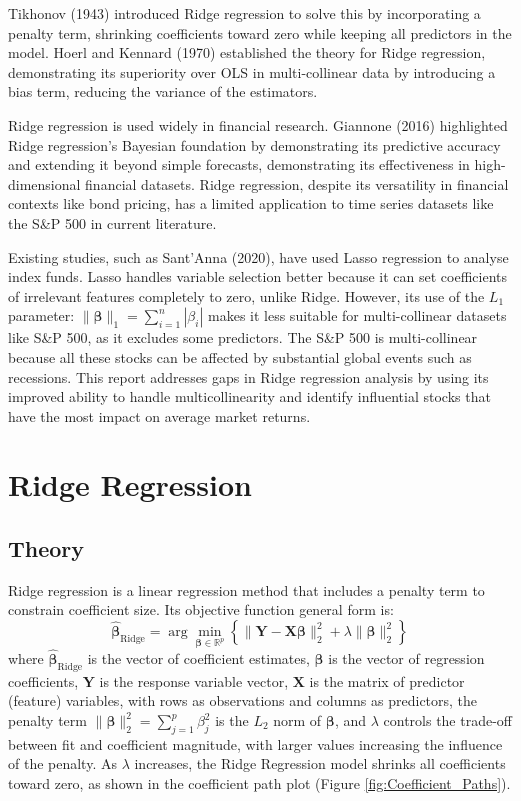 \documentclass[12pt]{report} %
\begin{document}
Tikhonov (1943) introduced Ridge regression to solve this by incorporating a penalty term, shrinking coefficients toward zero while keeping all predictors in the model.\cite{hailiang2023} Hoerl and Kennard (1970) established the theory for Ridge regression, demonstrating its superiority over OLS in multi-collinear data by introducing a bias term, reducing the variance of the estimators.\cite{hoerlken1970} 

Ridge regression is used widely in financial research. Giannone (2016) highlighted Ridge regression's Bayesian foundation by demonstrating its predictive accuracy and extending it beyond simple forecasts, demonstrating its effectiveness in high-dimensional financial datasets.\cite{giannone2016} Ridge regression, despite its versatility in financial contexts like bond pricing, has a limited application to time series datasets like the S\&P 500 in current literature.

Existing studies, such as Sant'Anna (2020), have used Lasso regression to analyse index funds. Lasso handles variable selection better because it can set coefficients of irrelevant features completely to zero, unlike Ridge. However, its use of the $L_1$ parameter: $\|\boldsymbol{\beta}\|_1 = \sum_{i=1}^{n} | \beta_i |$ makes it less suitable for multi-collinear datasets like S\&P 500, as it excludes some predictors. The S\&P 500 is multi-collinear because all these stocks can be affected by substantial global events such as recessions. This report addresses gaps in Ridge regression analysis by using its improved ability to handle multicollinearity and identify influential stocks that have the most impact on average market returns.

\section{Ridge Regression}
\subsection{Theory}
Ridge regression is a linear regression method that includes a penalty term to constrain coefficient size.\cite{hailiang2023} Its objective function general form is:
\[
\boldsymbol{\hat{\beta}}_{\text{Ridge}} = \arg \min_{\boldsymbol{\beta}\in \mathbb{R}^p} \left\{ \|\boldsymbol{Y} - \boldsymbol{X\beta}\|_2^2 + \lambda \|\boldsymbol{\beta}\|_2^2 \right\}
\]
where \(\boldsymbol{\hat{\beta}}_{\text{Ridge}}\) is the vector of coefficient estimates,  
\(\boldsymbol{\beta}\) is the vector of regression coefficients,  
\(\boldsymbol{Y}\) is the response variable vector,  
\(\boldsymbol{X}\) is the matrix of predictor (feature) variables, with rows as observations and columns as predictors,  
the penalty term \(\|\boldsymbol{\beta}\|_2^2 = \sum_{j=1}^{p} \beta_j^2\) is the $L_2$ norm of \(\boldsymbol{\beta}\),  
and \(\lambda\) controls the trade-off between fit and coefficient magnitude, with larger values increasing the influence of the penalty. As $\lambda$ increases, the Ridge Regression model shrinks all coefficients toward zero, as shown in the coefficient path plot (Figure \ref{fig:Coefficient_Paths}).
\end{document}
